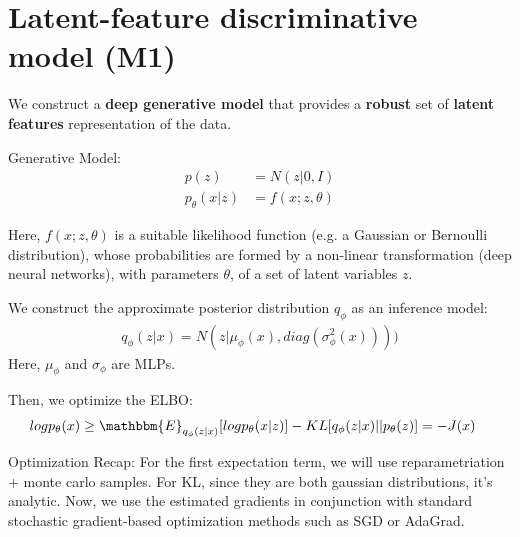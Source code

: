 \documentclass{beamer}
\let\tempone\itemize
\let\temptwo\enditemize
\renewenvironment{itemize}{\tempone\addtolength{\itemsep}{0.5\baselineskip}}{\temptwo}
\newcommand{\E}{\mathbbm{E}}
\begin{document}
\section{Latent-feature discriminative model (M1)}
\begin{frame}
  \begin{center}
      \begin{itemize}
        \item We construct a \textbf{deep generative model} that provides a \textbf{robust} set of \textbf{latent features} representation of the data.
        \item Generative Model:
          \begin{align}
            p(z) &= N(z|0,I)\\
            p_{\theta}(x|z) &= f(x;z, \theta)
          \end{align}
        \item Here, $f(x;z,\theta)$ is a suitable likelihood function (e.g. a Gaussian or Bernoulli distribution),
        whose probabilities are formed by a non-linear transformation (deep neural networks), with parameters $\theta$, of a set of latent variables $z$.
      \end{itemize}
  \end{center}
\end{frame}

\begin{frame}
  \begin{center}
    
\begin{itemize}
      \item We construct the approximate posterior distribution $q_{\phi}$ as an inference model:
        \begin{align*}
          q_{\phi}(z|x) = N(z|\mu_{\phi}(x), diag(\sigma_{\phi}^2(x))))
        \end{align*}
        Here, $\mu_{\phi}$ and $\sigma_{\phi}$ are MLPs.
      \item Then, we optimize the ELBO:
        \begin{align}
          log p_{\theta}(x) &\geq \E_{q_{\phi}(z|x)}[log p_{\theta}(x|z)] - KL[q_{\phi}(z|x)|| p_{\theta}(z)] 
                            = -J(x)
        \end{align}
      \item Optimization Recap: For the first expectation term, we will use reparametriation + monte carlo samples. For KL, since they are both gaussian distributions, it's analytic. Now, we use the estimated gradients in conjunction with standard stochastic gradient-based optimization methods such as SGD or AdaGrad.
\end{itemize}
  \end{center}
\end{frame}
\end{document}
